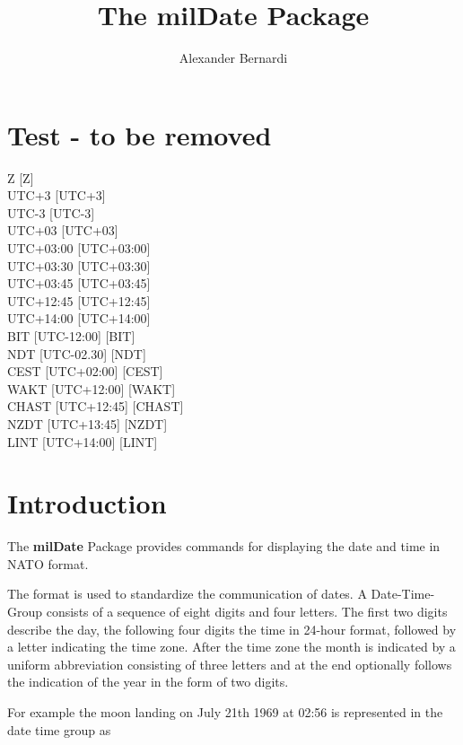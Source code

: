 \documentclass[a4paper,10pt]{scrarticle}
\title{\textnormal{The \textbf{milDate} Package}}
\author{Alexander Bernardi}
\begin{document}
\maketitle

\section{Test - to be removed}

Z [Z] \\
UTC+3 [UTC+3] \\
UTC-3 [UTC-3] \\
UTC+03 [UTC+03] \\
UTC+03:00 [UTC+03:00] \\
UTC+03:30 [UTC+03:30] \\
UTC+03:45 [UTC+03:45] \\
UTC+12:45 [UTC+12:45] \\
UTC+14:00 [UTC+14:00] \\
BIT [UTC-12:00] [BIT] \\
NDT [UTC-02.30] [NDT] \\
CEST [UTC+02:00] [CEST] \\
WAKT [UTC+12:00] [WAKT] \\
CHAST [UTC+12:45] [CHAST] \\
NZDT [UTC+13:45] [NZDT] \\
LINT [UTC+14:00] [LINT] \\



\section{Introduction}

The \textbf{milDate} Package provides commands for displaying the date and time in NATO format.\par
The format is used to standardize the communication of dates.
A Date-Time-Group consists of a sequence of eight digits and four letters. The first two digits describe the day, the following four digits the time in 24-hour format, followed by a letter indicating the time zone. After the time zone the month is indicated by a uniform abbreviation consisting of three letters and at the end optionally follows the indication of the year in the form of two digits. \par
For example the moon landing on July 21th 1969 at 02:56 is represented in the date time group as
\par\begin{center}
\end{center}\par
\end{document}
